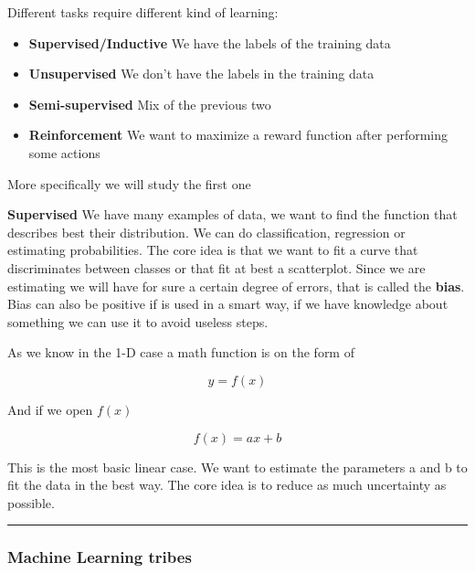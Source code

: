 \vspace{10pt}

Different tasks require different kind of learning:

\begin{itemize}
    \item \textbf{Supervised/Inductive} \ra We have the labels of the training data
    \item \textbf{Unsupervised} \ra We don't have the labels in the training data
    \item \textbf{Semi-supervised} \ra Mix of the previous two
    \item \textbf{Reinforcement} \ra We want to maximize a reward function after performing some actions
\end{itemize}

More specifically we will study the first one

\vspace{10pt}

\textbf{Supervised} \ra We have many examples of data, we want to find the function that describes best their distribution. We can do classification, regression or estimating probabilities. The core idea is that we want to fit a curve that discriminates between classes or that fit at best a scatterplot. Since we are estimating we will have for sure a certain degree of errors, that is called the \textbf{bias}. Bias can also be positive if is used in a smart way, if we have knowledge about something we can use it to avoid useless steps.

\vspace{10pt}

As we know in the 1-D case a math function is on the form of 

\begin{equation}
    y = f(x)
\end{equation}

And if we open $f(x)$

\begin{equation}
    f(x) = ax + b
\end{equation}

This is the most basic linear case. We want to estimate the parameters a and b to fit the data in the best way. The core idea is to reduce as much uncertainty as possible.

\hrule

\subsubsection{Machine Learning tribes}

